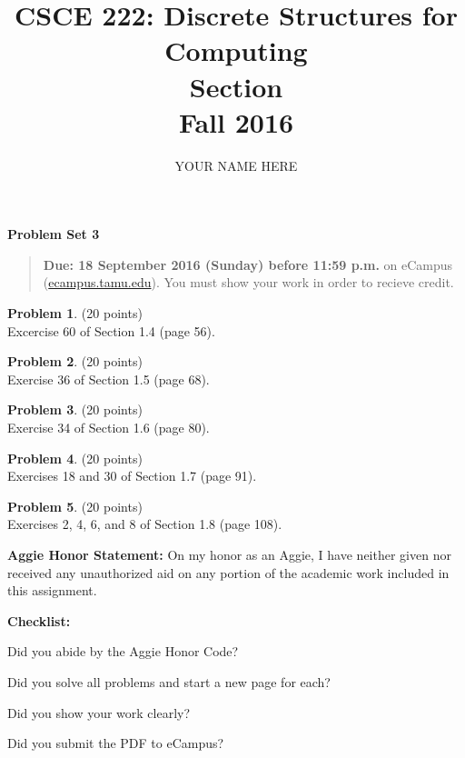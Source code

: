 \documentclass{article}
\title{CSCE 222: Discrete Structures for Computing\\Section \mysectionnumber\\Fall 2016}
\author{YOUR NAME HERE}
\theoremstyle{definition}
\newtheorem{problem}{Problem}
\newtheorem*{solution}{Solution}
\newcommand{\honor}{\noindent \textbf{Aggie Honor Statement: }On my honor as an Aggie, I have neither
  given nor received any unauthorized aid on any portion of the academic work included in this assignment.
}
\newcommand{\checklist}{\noindent\textbf{Checklist:}
\begin{compactenum}
\item Did you abide by the Aggie Honor Code?
\item Did you solve all problems and start a new page for each?
\item Did you show your work clearly?
\item Did you submit the PDF to eCampus?
\end{compactenum}
}
\newcommand{\problemset}[1]{\begin{center}\textbf{Problem Set #1}\end{center}}
\newcommand{\duedate}[1]{\begin{quote}\textbf{Due: #1} on eCampus (\url{ecampus.tamu.edu}). You must show your work in order to recieve credit.\end{quote}}
\begin{document}
\maketitle

\problemset{3}

\duedate{18 September 2016 (Sunday) before 11:59 p.m.}

\bigskip

\begin{problem} (20 points)\\
Excercise 60 of Section 1.4 (page 56).
\end{problem}



\begin{problem} (20 points)\\
Exercise 36 of Section 1.5 (page 68).
\end{problem}



\begin{problem} (20 points)\\
Exercise 34 of Section 1.6 (page 80).
\end{problem}



\begin{problem} (20 points)\\
Exercises 18 and 30 of Section 1.7 (page 91).
\end{problem}



\begin{problem} (20 points)\\
Exercises 2, 4, 6, and 8 of Section 1.8 (page 108).
\end{problem}




\bigskip
\honor

\bigskip
\checklist
\end{document}

